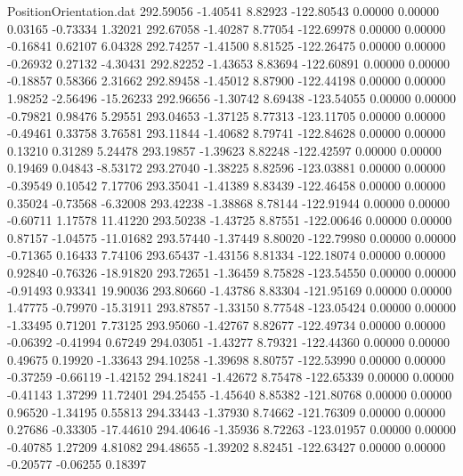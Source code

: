 \begin{filecontents}{PositionOrientation.dat}
 292.59056   -1.40541    8.82923  -122.80543    0.00000    0.00000    0.03165   -0.73334    1.32021
 292.67058   -1.40287    8.77054  -122.69978    0.00000    0.00000   -0.16841    0.62107    6.04328
 292.74257   -1.41500    8.81525  -122.26475    0.00000    0.00000   -0.26932    0.27132   -4.30431
 292.82252   -1.43653    8.83694  -122.60891    0.00000    0.00000   -0.18857    0.58366    2.31662
 292.89458   -1.45012    8.87900  -122.44198    0.00000    0.00000    1.98252   -2.56496  -15.26233
 292.96656   -1.30742    8.69438  -123.54055    0.00000    0.00000   -0.79821    0.98476    5.29551
 293.04653   -1.37125    8.77313  -123.11705    0.00000    0.00000   -0.49461    0.33758    3.76581
 293.11844   -1.40682    8.79741  -122.84628    0.00000    0.00000    0.13210    0.31289    5.24478
 293.19857   -1.39623    8.82248  -122.42597    0.00000    0.00000    0.19469    0.04843   -8.53172
 293.27040   -1.38225    8.82596  -123.03881    0.00000    0.00000   -0.39549    0.10542    7.17706
 293.35041   -1.41389    8.83439  -122.46458    0.00000    0.00000    0.35024   -0.73568   -6.32008
 293.42238   -1.38868    8.78144  -122.91944    0.00000    0.00000   -0.60711    1.17578   11.41220
 293.50238   -1.43725    8.87551  -122.00646    0.00000    0.00000    0.87157   -1.04575  -11.01682
 293.57440   -1.37449    8.80020  -122.79980    0.00000    0.00000   -0.71365    0.16433    7.74106
 293.65437   -1.43156    8.81334  -122.18074    0.00000    0.00000    0.92840   -0.76326  -18.91820
 293.72651   -1.36459    8.75828  -123.54550    0.00000    0.00000   -0.91493    0.93341   19.90036
 293.80660   -1.43786    8.83304  -121.95169    0.00000    0.00000    1.47775   -0.79970  -15.31911
 293.87857   -1.33150    8.77548  -123.05424    0.00000    0.00000   -1.33495    0.71201    7.73125
 293.95060   -1.42767    8.82677  -122.49734    0.00000    0.00000   -0.06392   -0.41994    0.67249
 294.03051   -1.43277    8.79321  -122.44360    0.00000    0.00000    0.49675    0.19920   -1.33643
 294.10258   -1.39698    8.80757  -122.53990    0.00000    0.00000   -0.37259   -0.66119   -1.42152
 294.18241   -1.42672    8.75478  -122.65339    0.00000    0.00000   -0.41143    1.37299   11.72401
 294.25455   -1.45640    8.85382  -121.80768    0.00000    0.00000    0.96520   -1.34195    0.55813
 294.33443   -1.37930    8.74662  -121.76309    0.00000    0.00000    0.27686   -0.33305  -17.44610
 294.40646   -1.35936    8.72263  -123.01957    0.00000    0.00000   -0.40785    1.27209    4.81082
 294.48655   -1.39202    8.82451  -122.63427    0.00000    0.00000   -0.20577   -0.06255    0.18397

\end{filecontents}
